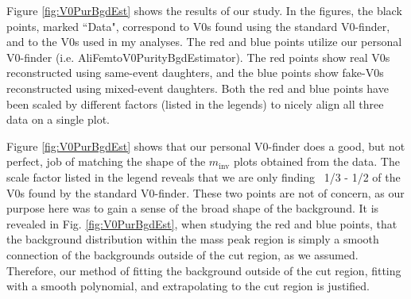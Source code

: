 \documentclass[/home/jesse/Analysis/FemtoAnalysis/AnalysisNotes/AnalysisNoteJBuxton.tex]{subfiles}
\begin{document}
Figure \ref{fig:V0PurBgdEst} shows the results of our study.  
In the figures, the black points, marked ``Data", correspond to V0s found using the standard V0-finder, and to the V0s used in my analyses.
The red and blue points utilize our personal V0-finder (i.e. AliFemtoV0PurityBgdEstimator).
The red points show real V0s reconstructed using same-event daughters, and the blue points show fake-V0s reconstructed using mixed-event daughters.  
Both the red and blue points have been scaled by different factors (listed in the legends) to nicely align all three data on a single plot.

Figure \ref{fig:V0PurBgdEst} shows that our personal V0-finder does a good, but not perfect, job of matching the shape of the $m_{\mathrm{inv}}$ plots obtained from the data.  
The scale factor listed in the legend reveals that we are only finding ~1/3 - 1/2 of the V0s found by the standard V0-finder.  
These two points are not of concern, as our purpose here was to gain a sense of the broad shape of the background.  
It is revealed in Fig. \ref{fig:V0PurBgdEst}, when studying the red and blue points, that the background distribution within the mass peak region is simply a smooth connection of the backgrounds outside of the cut region, as we assumed.  
Therefore, our method of fitting the background outside of the cut region, fitting with a smooth polynomial, and extrapolating to the cut region is justified.
\end{document}
